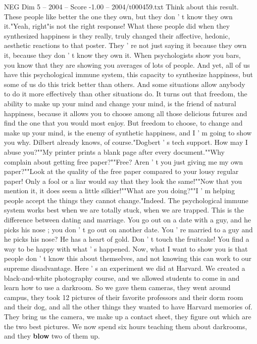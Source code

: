 \begin{textsample}{NEG Dim 5 – 2004 – Score -1.00 – 2004/t000459.txt}
Think about this result.
These people like better the one they own, but they don ' t know they own it."Yeah, right"is not the right response!
What these people did when they synthesized happiness is they really, truly changed their affective, hedonic, aesthetic reactions to that poster.
They ' re not just saying it because they own it, because they don ' t know they own it.
When psychologists show you bars, you know that they are showing you averages of lots of people.
And yet, all of us have this psychological immune system, this capacity to synthesize happiness, but some of us do this trick better than others.
And some situations allow anybody to do it more effectively than other situations do.
It turns out that freedom, the ability to make up your mind and change your mind, is the friend of natural happiness, because it allows you to choose among all those delicious futures and find the one that you would most enjoy.
But freedom to choose, to change and make up your mind, is the enemy of synthetic happiness, and I ' m going to show you why.
Dilbert already knows, of course."Dogbert ' s tech support.
How may I abuse you?""My printer prints a blank page after every document.""Why complain about getting free paper?""Free?
Aren ' t you just giving me my own paper?""Look at the quality of the free paper compared to your lousy regular paper!
Only a fool or a liar would say that they look the same!""Now that you mention it, it does seem a little silkier!""What are you doing?""I ' m helping people accept the things they cannot change."Indeed.
The psychological immune system works best when we are totally stuck, when we are trapped.
This is the difference between dating and marriage.
You go out on a date with a guy, and he picks his nose ; you don ' t go out on another date.
You ' re married to a guy and he picks his nose?
He has a heart of gold.
Don ' t touch the fruitcake!
You find a way to be happy with what ' s happened.
Now, what I want to show you is that people don ' t know this about themselves, and not knowing this can work to our supreme disadvantage.
Here ' s an experiment we did at Harvard.
We created a black-and-white photography course, and we allowed students to come in and learn how to use a darkroom.
So we gave them cameras, they went around campus, they took 12 pictures of their favorite professors and their dorm room and their dog, and all the other things they wanted to have Harvard memories of.
They bring us the camera, we make up a contact sheet, they figure out which are the two best pictures.
We now spend six hours teaching them about darkrooms, and they \textbf{blow} two of them up.

\end{textsample}
